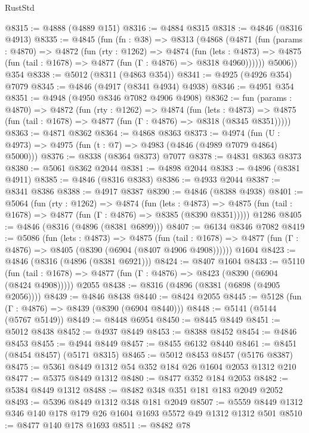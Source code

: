 \begin{lexlean}{RustStd}
\begin{coremodule}
@8315 := @4888 (@4889 @151)
@8316 := @4884 @8315
@8318 := @4846 (@8316 @4913)
@8335 := @4845
    (fun (fn : @38) =>
    @8313
      (@4868
        (@4871
          (fun (params : @4870) =>
          @4872
            (fun (rty : @1262) =>
            @4874
              (fun (lets : @4873) =>
              @4875 (fun (tail : @1678) => @4877 (fun (Γ : @4876) => @8318 @4960))))))
        @5006))
    @354
@8338 := @5012 (@8311 (@4863 @354))
@8341 := @4925 (@4926 @354) @7079
@8345 := @4846 (@4917 (@8341 @4934) @4938)
@8346 := @4951 @354
@8351 := @4948 (@4950 @8346 @7082 @4906 @4908)
@8362 := fun (params : @4870) =>
  @4872
    (fun (rty : @1262) =>
    @4874
      (fun (lets : @4873) =>
      @4875 (fun (tail : @1678) => @4877 (fun (Γ : @4876) => @8318 (@8345 @8351)))))
@8363 := @4871 @8362
@8364 := @4868 @8363
@8373 := @4974 (fun (U : @4973) => @4975 (fun (t : @7) => @4983 (@4846 (@4989 @7079 @4864) @5000)))
@8376 := @8338 (@8364 @8373) @7077
@8378 := @4831 @8363 @8373
@8380 := @5061 @8362 @2044
@8381 := @4898 @2044
@8383 := @4896 (@8381 @4911)
@8385 := @4846 (@8316 @8383)
@8386 := @4933 @2044
@8387 := @8341 @8386
@8388 := @4917 @8387
@8390 := @4846 (@8388 @4938)
@8401 := @5064
    (fun (rty : @1262) =>
    @4874
      (fun (lets : @4873) =>
      @4875 (fun (tail : @1678) => @4877 (fun (Γ : @4876) => @8385 (@8390 @8351)))))
    @1286
@8405 := @4846 (@8316 (@4896 (@8381 @6899)))
@8407 := @6134 @8346 @7082
@8419 := @5086
    (fun (lets : @4873) =>
    @4875
      (fun (tail : @1678) => @4877 (fun (Γ : @4876) => @8405 (@8390 (@6904 (@8407 @4906 @4908))))))
    @1604
@8423 := @4846 (@8316 (@4896 (@8381 @6921)))
@8424 := @8407 @1604
@8433 := @5110
    (fun (tail : @1678) => @4877 (fun (Γ : @4876) => @8423 (@8390 (@6904 (@8424 @4908)))))
    @2055
@8438 := @8316 (@4896 (@8381 (@6898 (@4905 @2056))))
@8439 := @4846 @8438
@8440 := @8424 @2055
@8445 := @5128 (fun (Γ : @4876) => @8439 (@8390 (@6904 @8440)))
@8448 := @5141 (@5144 (@5767 @5149))
@8449 := @8448 @6954
@8450 := @8445 @8449
@8451 := @5012 @8438
@8452 := @4937 @8449
@8453 := @8388 @8452
@8454 := @4846 @8453
@8455 := @4944 @8449
@8457 := @8455 @6132 @8440
@8461 := @8451 (@8454 @8457) (@5171 @8315)
@8465 := @5012 @8453 @8457 (@5176 @8387)
@8475 := @5361 @8449 @1312 @54 @352 @184 @26 @1604 @2053 @1312 @210
@8477 := @5375 @8449 @1312
@8480 := @8477 @352 @184 @2053
@8482 := @5384 @8449 @1312
@8488 := @8482 @348 @351 @181 @183 @2049 @2052
@8493 := @5396 @8449 @1312 @348 @181 @2049
@8507 := @5559 @8449 @1312 @346 @140 @178 @179 @26 @1604 @1693 @5572 @49 @1312 @1312 @501
@8510 := @8477 @140 @178 @1693
@8511 := @8482 @78

\end{coremodule}
\end{lexlean}
